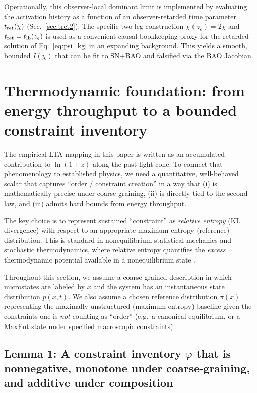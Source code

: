 \documentclass[10pt]{article}
\newcommand{\tlb}{t_{\mathrm{lb}}}
\begin{document}
Operationally, this observer-local dominant limit is implemented by evaluating the activation history as a
function of an observer-retarded time parameter \(t_{\rm ret}(\chi)\) (Sec.~\ref{sec:tret2}).
The specific two-leg construction \(\chi(z_e)=2\chi\) and \(t_{\rm ret}=\tlb(z_e)\) is used as a convenient causal
bookkeeping proxy for the retarded solution of Eq.~\eqref{eq:psi_kg} in an expanding background.
This yields a smooth, bounded \(I(\chi)\) that can be fit to SN+BAO and falsified via the BAO Jacobian.

\section{Thermodynamic foundation: from energy throughput to a bounded constraint inventory}
\label{sec:thermo_foundation}

The empirical LTA mapping in this paper is written as an accumulated contribution to
$\ln(1+z)$ along the past light cone. To connect that phenomenology to established physics, we need 
a quantitative, well-behaved scalar that captures ``order / constraint creation'' in a way that (i) 
is mathematically precise under coarse-graining, (ii) is directly tied to the second law, and (iii) 
admits hard bounds from energy throughput.

The key choice is to represent sustained ``constraint'' as \emph{relative entropy} (KL divergence)
with respect to an appropriate maximum-entropy (reference) distribution.
This is standard in nonequilibrium statistical mechanics and stochastic thermodynamics, where
relative entropy quantifies the \emph{excess} thermodynamic potential available in a nonequilibrium
state \cite{Seifert2012ST,Parrondo2015ThermoInfo}.

Throughout this section, we assume a coarse-grained description in which microstates are labeled
by $x$ and the system has an instantaneous state distribution $p(x,t)$. We also assume a chosen
reference distribution $\pi(x)$ representing the maximally unstructured (maximum-entropy) baseline
given the constraints one is \emph{not} counting as ``order'' (e.g.\ a canonical equilibrium, or a
MaxEnt state under specified macroscopic constraints).

\subsection{Lemma 1: A constraint inventory $\varphi$ that is nonnegative, monotone under coarse-graining, and additive under composition}
\label{sec:lemma1_constraint_inventory}
\end{document}
